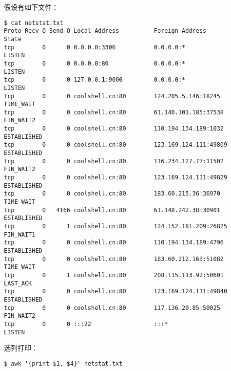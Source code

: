 假设有如下文件：
\begin{verbatim}
$ cat netstat.txt
Proto Recv-Q Send-Q Local-Address          Foreign-Address             State
tcp        0      0 0.0.0.0:3306           0.0.0.0:*                   LISTEN
tcp        0      0 0.0.0.0:80             0.0.0.0:*                   LISTEN
tcp        0      0 127.0.0.1:9000         0.0.0.0:*                   LISTEN
tcp        0      0 coolshell.cn:80        124.205.5.146:18245         TIME_WAIT
tcp        0      0 coolshell.cn:80        61.140.101.185:37538        FIN_WAIT2
tcp        0      0 coolshell.cn:80        110.194.134.189:1032        ESTABLISHED
tcp        0      0 coolshell.cn:80        123.169.124.111:49809       ESTABLISHED
tcp        0      0 coolshell.cn:80        116.234.127.77:11502        FIN_WAIT2
tcp        0      0 coolshell.cn:80        123.169.124.111:49829       ESTABLISHED
tcp        0      0 coolshell.cn:80        183.60.215.36:36970         TIME_WAIT
tcp        0   4166 coolshell.cn:80        61.148.242.38:30901         ESTABLISHED
tcp        0      1 coolshell.cn:80        124.152.181.209:26825       FIN_WAIT1
tcp        0      0 coolshell.cn:80        110.194.134.189:4796        ESTABLISHED
tcp        0      0 coolshell.cn:80        183.60.212.163:51082        TIME_WAIT
tcp        0      1 coolshell.cn:80        208.115.113.92:50601        LAST_ACK
tcp        0      0 coolshell.cn:80        123.169.124.111:49840       ESTABLISHED
tcp        0      0 coolshell.cn:80        117.136.20.85:50025         FIN_WAIT2
tcp        0      0 :::22                  :::*                        LISTEN 
\end{verbatim}

选列打印：
\begin{verbatim}
$ awk '{print $1, $4}' netstat.txt
\end{verbatim}

